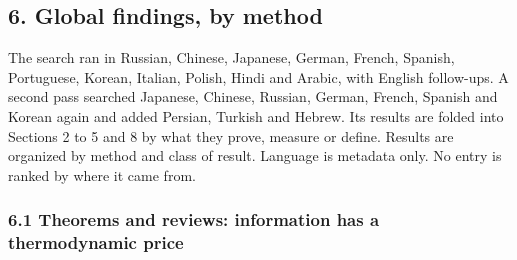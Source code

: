 \documentclass[
  10pt,
]{article}
\begin{document}
\subsection{6. Global findings, by
method}\label{global-findings-by-method}

The search ran in Russian, Chinese, Japanese, German, French, Spanish,
Portuguese, Korean, Italian, Polish, Hindi and Arabic, with English
follow-ups. A second pass searched Japanese, Chinese, Russian, German,
French, Spanish and Korean again and added Persian, Turkish and Hebrew.
Its results are folded into Sections 2 to 5 and 8 by what they prove,
measure or define. Results are organized by method and class of result.
Language is metadata only. No entry is ranked by where it came from.

\subsubsection{6.1 Theorems and reviews: information has a thermodynamic
price}\label{theorems-and-reviews-information-has-a-thermodynamic-price}
\end{document}

